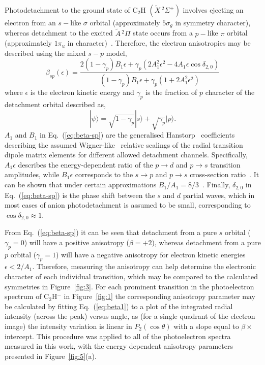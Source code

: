 \documentclass[aip,graphicx]{revtex4-1}
\begin{document}
Photodetachment to the ground state of C$_2$H $(\tilde{X}\,^2\Sigma^+)$ involves ejecting an electron from an $s-$like $\sigma$ orbital (approximately $5\sigma_g$ in symmetry character), whereas detachment to the excited $\tilde{A}\,^2\Pi$ state occurs from a $p-$like $\pi$ orbital (approximately $1\pi_u$ in character)~\cite{gul21}. Therefore, the electron anisotropies may be described using the mixed $s-p$ model\cite{khu14},
\begin{equation}
\beta_{sp}(\epsilon) = \frac{2(1-\gamma_p)B_1\epsilon + \gamma_p(2A_1^2\epsilon^2-4A_1\epsilon\cos\delta_{2,0})}
{(1-\gamma_p)B_1\epsilon+\gamma_p(1+2A_1^2\epsilon^2)}
\label{eq:beta-sp}
\end{equation}
where $\epsilon$ is the electron kinetic energy and $\gamma_p$ is the fraction of $p$ character of the detachment orbital described as,
\begin{equation}
|\psi\rangle = \sqrt{1-\gamma_p}|s\rangle + \sqrt{\gamma_p}|p\rangle.
\end{equation}
$A_1$ and $B_1$ in Eq.~(\ref{eq:beta-sp}) are the generalised Hanstorp~\cite{han89} coefficients describing the assumed Wigner-like~\cite{wig48} relative scalings of the radial transition dipole matrix elements for different allowed detachment channels. Specifically, $A_1\epsilon$ describes the energy-dependent ratio of the $p\rightarrow d$ and $p\rightarrow s$ transition amplitudes, while $B_1\epsilon$ corresponds to the $s\rightarrow p$ and $p\rightarrow s$ cross-section ratio~\cite{khu14}. It can be shown that under certain approximations $B_1/A_1 = 8/3$~\cite{san13}. Finally, $\delta_{2,0}$ in Eq.~(\ref{eq:beta-sp}) is the phase shift between the $s$ and $d$ partial waves, which in most cases of anion photodetachment is assumed to be small, corresponding to $\cos\delta_{2,0}\approx1$.

From Eq.~(\ref{eq:beta-sp}) it can be seen that detachment from a pure $s$ orbital ($\gamma_p=0$) will have a positive anisotropy ($\beta = +2$), whereas detachment from a pure $p$ orbital ($\gamma_p=1$) will have a negative anisotropy for electron kinetic energies $\epsilon < 2/A_1$. Therefore, measuring the anisotropy can help determine the electronic character of each individual transition, which may be compared to the calculated symmetries in Figure~\ref{fig:3}. For each prominent transition in the photoelectron spectrum of C$_2$H$^-$ in Figure~\ref{fig:1} the corresponding anisotropy parameter may be calculated by fitting Eq.~(\ref{eq:beta1}) to a plot of the integrated radial intensity (across the peak) versus angle, as (for a single quadrant of the electron image) the intensity variation is linear in $P_2(\cos\theta)$ with a slope equal to $\beta\times$intercept. This procedure was applied to all of the photoelectron spectra measured in this work, with the energy dependent anisotropy parameters presented in Figure~\ref{fig:5}(a).
\end{document}
